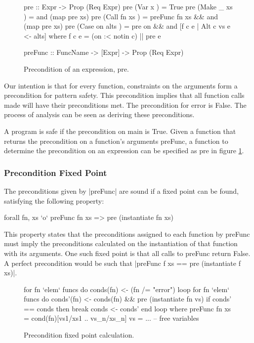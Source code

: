 \documentclass[preprint]{sigplanconf}
\newcommand{\C}[1]{\textsf{#1}}
\begin{document}
\begin{figure}
\begin{code}
pre :: Expr -> Prop (Req Expr)
pre (Var   x         ) = True
pre (Make  _   xs    ) = and (map pre xs)
pre (Call  fn  xs    ) = preFunc fn xs && and (map pre xs)
pre (Case  on  alts  ) = pre on && and [f c e | Alt c vs e <- alts]
    where f c e = (on :< notin c) || pre e

preFunc :: FuncName -> [Expr] -> Prop (Req Expr)
\end{code}
\caption{Precondition of an expression, \C{pre}.}
\label{fig:precondition}
\end{figure}

Our intention is that for every function, constraints on the arguments form a precondition for pattern safety. This precondition implies that all function calls made will have their preconditions met. The precondition for \C{error} is False. The process of analysis can be seen as deriving these preconditions.

A program is safe if the precondition on \C{main} is True. Given a function that returns the precondition on a function's arguments \C{preFunc}, a function to determine the precondition on an expression can be specified as \C{pre} in figure \ref{fig:precondition}.

\subsubsection{Precondition Fixed Point}

The preconditions given by |preFunc| are sound if a fixed point can be found, satisfying the following property:

\begin{code}
forall fn, xs `o` preFunc fn xs => pre (instantiate fn xs)
\end{code}

This property states that the preconditions assigned to each function by \C{preFunc} must imply the preconditions calculated on the instantiation of that function with its arguments. One such fixed point is that all calls to \C{preFunc} return False. A perfect precondition would be such that |preFunc f xs == pre (instantiate f xs)|.

\begin{figure}
\begin{code}
for fn `elem` funcs do conds(fn) <- (fn /= "error")
loop
    for fn `elem` funcs do
        conds'(fn) <- conds(fn) && pre (instantiate fn vs)
    if conds' == conds then break
    conds <- conds'
end loop
    where
        preFunc fn xs = cond(fn)[vs1/xs1 .. vs_n/xs_n]
        vs = ... -- free variables
\end{code}
\caption{Precondition fixed point calculation.}
\label{fig:precond_fixp}
\end{figure}
\end{document}
